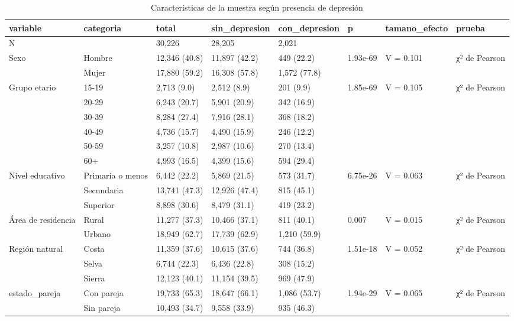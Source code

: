 \begin{table}[htbp]
\caption{Características de la muestra según presencia de depresión}
\label{tab:tabla_07_caracteristicas_muestra}
\begin{tabular}{llllllll}
\toprule
variable & categoria & total & sin\_depresion & con\_depresion & p & tamano\_efecto & prueba \\
\midrule
N &  & 30,226 & 28,205 & 2,021 &  &  &  \\
Sexo & Hombre & 12,346 (40.8) & 11,897 (42.2) & 449 (22.2) & 1.93e-69 & V = 0.101 & χ² de Pearson \\
 & Mujer & 17,880 (59.2) & 16,308 (57.8) & 1,572 (77.8) &  &  &  \\
Grupo etario & 15-19 & 2,713 (9.0) & 2,512 (8.9) & 201 (9.9) & 1.85e-69 & V = 0.105 & χ² de Pearson \\
 & 20-29 & 6,243 (20.7) & 5,901 (20.9) & 342 (16.9) &  &  &  \\
 & 30-39 & 8,284 (27.4) & 7,916 (28.1) & 368 (18.2) &  &  &  \\
 & 40-49 & 4,736 (15.7) & 4,490 (15.9) & 246 (12.2) &  &  &  \\
 & 50-59 & 3,257 (10.8) & 2,987 (10.6) & 270 (13.4) &  &  &  \\
 & 60+ & 4,993 (16.5) & 4,399 (15.6) & 594 (29.4) &  &  &  \\
Nivel educativo & Primaria o menos & 6,442 (22.2) & 5,869 (21.5) & 573 (31.7) & 6.75e-26 & V = 0.063 & χ² de Pearson \\
 & Secundaria & 13,741 (47.3) & 12,926 (47.4) & 815 (45.1) &  &  &  \\
 & Superior & 8,898 (30.6) & 8,479 (31.1) & 419 (23.2) &  &  &  \\
Área de residencia & Rural & 11,277 (37.3) & 10,466 (37.1) & 811 (40.1) & 0.007 & V = 0.015 & χ² de Pearson \\
 & Urbano & 18,949 (62.7) & 17,739 (62.9) & 1,210 (59.9) &  &  &  \\
Región natural & Costa & 11,359 (37.6) & 10,615 (37.6) & 744 (36.8) & 1.51e-18 & V = 0.052 & χ² de Pearson \\
 & Selva & 6,744 (22.3) & 6,436 (22.8) & 308 (15.2) &  &  &  \\
 & Sierra & 12,123 (40.1) & 11,154 (39.5) & 969 (47.9) &  &  &  \\
estado\_pareja & Con pareja & 19,733 (65.3) & 18,647 (66.1) & 1,086 (53.7) & 1.94e-29 & V = 0.065 & χ² de Pearson \\
 & Sin pareja & 10,493 (34.7) & 9,558 (33.9) & 935 (46.3) &  &  &  \\

\end{tabular}
\end{table}
